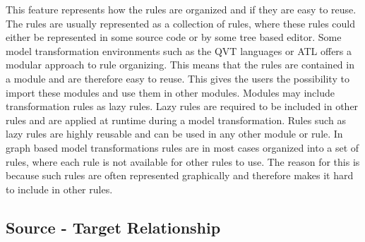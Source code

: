 This feature represents how the rules are organized and if they are easy to
reuse. The rules are usually represented as a collection of rules, where these
rules could either be represented in some source code or by some tree based
editor. Some model transformation environments such as the QVT languages or ATL
offers a modular approach to rule organizing. This means that the rules are
contained in a module and are therefore easy to reuse. This gives the users the
possibility to import these modules and use them in other modules. Modules may
include transformation rules as lazy rules. Lazy rules are required to be
included in other rules and are applied at runtime during a model
transformation. Rules such as lazy rules are highly reusable and can be used in
any other module or rule. In graph based model transformations rules are in
most cases organized into a set of rules, where each rule is not available for
other rules to use. The reason for this is because such rules are often
represented graphically and therefore makes it hard to include in other rules. 

\subsection{Source - Target Relationship}



